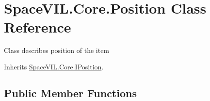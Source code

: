 \hypertarget{class_space_v_i_l_1_1_core_1_1_position}{}\section{Space\+V\+I\+L.\+Core.\+Position Class Reference}
\label{class_space_v_i_l_1_1_core_1_1_position}


Class describes position of the item  




Inherits \mbox{\hyperlink{interface_space_v_i_l_1_1_core_1_1_i_position}{Space\+V\+I\+L.\+Core.\+I\+Position}}.

\subsection*{Public Member Functions}
